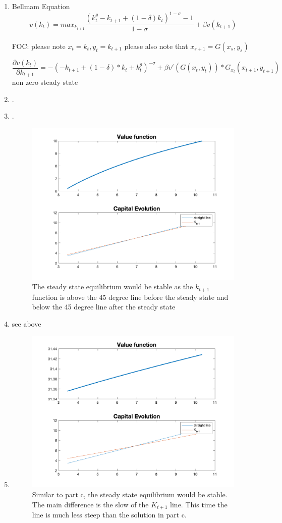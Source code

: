 \begin{enumerate}
    \item  Bellmam Equation $$v(k_t)= max_{k_{t+1}} \frac{(k_t^\theta -k_{t+1}+(1-\delta)k_t)^{1-\sigma}-1}{1-\sigma}+\beta v(k_{t+1})$$\\
    FOC: please note $x_t=k_t, y_t=k_{t+1}$ please also note that $x_{s+1}=G(x_s,y_s)$
    
    $$\frac{\partial v(k_t)}{\partial k_{t+1}}=-( -k_{t+1} + (1-\delta)*k_t +k_t^\theta)^{-\sigma}
   +\beta v'(G(x_t,y_t))*G_{x_t}(x_{t+1},y_{t+1})$$
   non zero steady state 
   $$$$
   \item. 
   \item .
   \newline
   \begin{figure}[H]
       \centering
       \includegraphics[width = .7\linewidth]{HW3/pics/HW3_Q2_figure.png}
       \caption{The steady state equilibrium would be stable as the $k_{t+1}$ function is above the 45 degree line before the steady state and below the 45 degree line after the steady state}
       \label{fig:HW3_2c}
   \end{figure}
   \item see above
   \item 
   \begin{figure}[H]
       \centering
       \includegraphics[width = .7\linewidth]{HW3/pics/HW3_Q2_e_figure.png}
       \caption{Similar to part c, the steady state equilibrium would be stable. The main difference is the slow of the $K_{t+1}$ line. This time the line is much less steep than the solution in part c.}
       \label{fig:HW3_2e}
   \end{figure}
\end{enumerate}